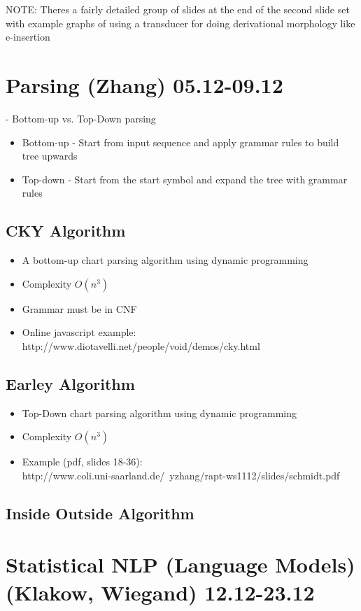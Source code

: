 \documentclass[11pt]{article}
\begin{document}
NOTE: Theres a fairly detailed group of slides at the end of the second slide set with example graphs  of using a transducer for doing derivational morphology like e-insertion


\section{Parsing (Zhang) 05.12-09.12}

- Bottom-up vs. Top-Down parsing
\begin{itemize}
 \item Bottom-up - Start from input sequence and apply grammar rules to build tree upwards
 \item Top-down - Start from the start symbol and expand the tree with grammar rules
\end{itemize}
\subsection{ CKY Algorithm }
\begin{itemize}
 \item A bottom-up chart parsing algorithm using dynamic programming
 \item Complexity $O(n^3)$ 
 \item Grammar must be in CNF
 \item Online javascript example: http://www.diotavelli.net/people/void/demos/cky.html
\end{itemize}
\subsection{ Earley Algorithm }
\begin{itemize}
 \item Top-Down chart parsing algorithm using dynamic programming
 \item Complexity $O(n^3)$
 \item Example (pdf, slides 18-36): \\http://www.coli.uni-saarland.de/~yzhang/rapt-ws1112/slides/schmidt.pdf
\end{itemize}
\subsection { Inside Outside Algorithm }



\section{Statistical NLP (Language Models) (Klakow, Wiegand) 12.12-23.12}
\end{document}
